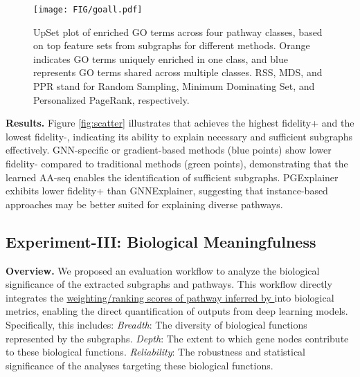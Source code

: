 \begin{figure*}[t]
\centering
\texttt{[image: FIG/goall.pdf]}
\caption{UpSet plot of enriched GO terms across four pathway classes, based on top feature sets from subgraphs for different methods. Orange indicates GO terms uniquely enriched in one class, and blue represents GO terms shared across multiple classes. RSS, MDS, and PPR stand for Random Sampling, Minimum Dominating Set, and Personalized PageRank, respectively. }
\label{fig:go}
\end{figure*}

\noindent\textbf{Results.} 
Figure \ref{fig:scatter} illustrates that \explainer achieves the highest fidelity+ and the lowest fidelity-, indicating its ability to explain necessary and sufficient subgraphs effectively. 
GNN-specific or gradient-based methods (blue points) show lower fidelity- compared to traditional methods (green points), demonstrating that the learned AA-seq enables the identification of sufficient subgraphs. 
PGExplainer exhibits lower fidelity+ than GNNExplainer, suggesting that instance-based approaches may be better suited for explaining diverse pathways.



\subsection{Experiment-III: Biological Meaningfulness}
\textbf{Overview. }
We proposed an evaluation workflow to analyze the biological significance of the extracted subgraphs and pathways. 
This workflow directly integrates the \ul{weighting/ranking scores of pathway inferred by \explainer} into biological metrics, enabling the direct quantification of outputs from deep learning models. 
Specifically, this includes: \textit{Breadth}: The diversity of biological functions represented by the subgraphs.
\textit{Depth}: The extent to which gene nodes contribute to these biological functions.
\textit{Reliability}: The robustness and statistical significance of the analyses targeting these biological functions.

